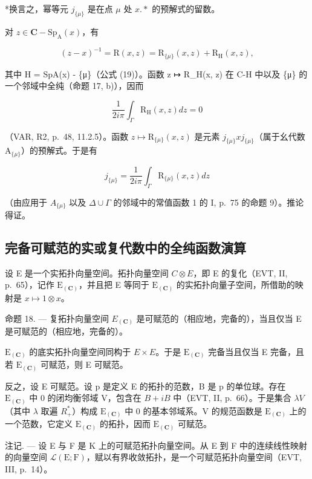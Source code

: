 *换言之，幂等元 \(j_{\{\mu\}}\) 是在点 \(\mu\) 处 \(x.*\) 的预解式的留数。

对 \(z\in \mathbf{C} - \mathrm{Sp}_{\mathrm{A}}(x)\)，有

\[
(z - x) ^ {- 1} = \mathrm{R} (x, z) = \mathrm{R} _ {\{\mu \}} (x, z) + \mathrm{R} _ {\mathrm{H}} (x, z),
\]

其中 H = SpA(x) - \{μ\}（公式 (19)）。函数 z ↦ R\_H(x, z) 在 C-H 中以及 \{μ\} 的一个邻域中全纯（命题 17, b)），因而

\[
\frac {1}{2 i \pi} \int_ {\Gamma} \mathrm{R} _ {\mathrm{H}} (x, z) d z = 0
\]

（VAR, R2, p.~48, 11.2.5）。函数 \(z \mapsto \mathrm{R}_{\{\mu\}}(x,z)\) 是元素 \(j_{\{\mu\}}xj_{\{\mu\}}\)（属于幺代数 \(\mathrm{A}_{\{\mu\}}\)）的预解式。于是有

\[
j _ {\{\mu \}} = \frac {1}{2 i \pi} \int_ {\Gamma} \mathrm{R} _ {\{\mu \}} (x, z) d z
\]

（由应用于 \(A_{\{\mu\}}\) 以及 \(\Delta \cup \Gamma\) 的邻域中的常值函数 1 的 I, p.~75 的命题 9）。推论得证。

\subsection{完备可赋范的实或复代数中的全纯函数演算}

设 E 是一个实拓扑向量空间。拓扑向量空间 \(C \otimes E\)，即 E 的复化（EVT, II, p.~65），记作 \(\mathrm{E}_{(\mathbf{C})}\)，并且把 E 等同于 \(\mathrm{E}_{(\mathbf{C})}\) 的实拓扑向量子空间，所借助的映射是 \(x \mapsto 1 \otimes x\)。

命题 18. --- 复拓扑向量空间 \(E_{(\mathbf{C})}\) 是可赋范的（相应地，完备的），当且仅当 E 是可赋范的（相应地，完备的）。

\(\mathrm{E}_{(\mathbf{C})}\) 的底实拓扑向量空间同构于 \(E \times E\)。于是 \(\mathrm{E}_{(\mathbf{C})}\) 完备当且仅当 E 完备，且若 \(\mathrm{E}_{(\mathbf{C})}\) 可赋范，则 E 可赋范。

反之，设 E 可赋范。设 p 是定义 E 的拓扑的范数，B 是 p 的单位球。存在 \(\mathrm{E}_{(\mathbf{C})}\) 中 0 的闭均衡邻域 V，包含在 \(B+iB\) 中（EVT, II, p.~66）。于是集合 \(\lambda V\)（其中 \(\lambda\) 取遍 \(R_{+}^{*}\)）构成 \(\mathrm{E}_{(\mathbf{C})}\) 中 0 的基本邻域系。V 的规范函数是 \(\mathrm{E}_{(\mathbf{C})}\) 上的一个范数，它定义 \(\mathrm{E}_{(\mathbf{C})}\) 的拓扑，因而 \(\mathrm{E}_{(\mathbf{C})}\) 可赋范。

注记. --- 设 E 与 F 是 K 上的可赋范拓扑向量空间。从 E 到 F 中的连续线性映射的向量空间 \(\mathcal{L}(\mathrm{E};\mathrm{F})\)，赋以有界收敛拓扑，是一个可赋范拓扑向量空间（EVT, III, p.~14）。


